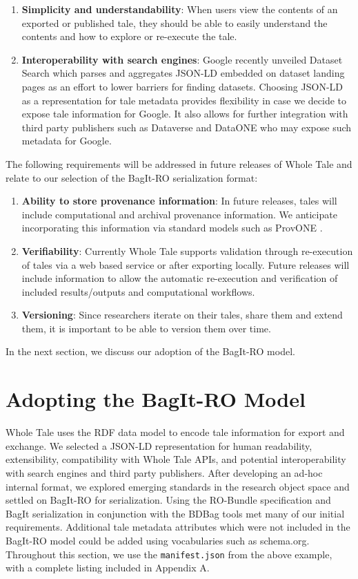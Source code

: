\documentclass[conference]{IEEEtran}
\begin{document}
\begin{enumerate}
\item{{\bf Simplicity and understandability}: When users view the contents of an exported or published tale, they should be able to easily understand the contents and how to explore or re-execute the tale.}
\item{{\bf Interoperability with search engines}: Google recently unveiled Dataset Search which parses and aggregates JSON-LD embedded on dataset landing pages as an effort to lower barriers for finding datasets. Choosing JSON-LD as a representation for tale metadata provides flexibility in case we decide to expose tale information for Google. It also allows for further integration with third party publishers such as Dataverse and DataONE who may expose such metadata for Google.}
\end{enumerate}

The following requirements will be addressed in future releases of Whole Tale and relate to our selection of the BagIt-RO serialization format:
\begin{enumerate}
\item{{\bf Ability to store provenance information}: In future
    releases, tales will include computational and archival provenance
    information. We anticipate incorporating this information via
    standard models such as ProvONE \cite{ProvONE}.}
\item{{\bf Verifiability}: Currently Whole Tale supports validation through re-execution of tales via a web based service or after exporting locally. Future releases will include information to allow the automatic re-execution and verification of included results/outputs and computational workflows.}
\item{{\bf Versioning}: Since researchers iterate on their tales, share them and extend them, it is important to be able to version them over time.}
\end{enumerate}

In the next section, we discuss our adoption of the BagIt-RO model.

\section{Adopting the BagIt-RO Model} \label{adopting}

Whole Tale uses the RDF data model to encode tale information for export and exchange. We selected  a JSON-LD representation for human readability, extensibility, compatibility with Whole Tale APIs, and potential interoperability with search engines and third party publishers. After developing an  ad-hoc internal format, we explored emerging standards in the research object space and settled on BagIt-RO for serialization. Using the RO-Bundle specification and BagIt serialization in conjunction with the BDBag tools met many of our initial requirements. Additional tale metadata attributes which were not included in the BagIt-RO model could be added using vocabularies such as schema.org. Throughout this section, we use the \texttt{manifest.json} from the above example, with a complete listing included in Appendix A.
\end{document}
